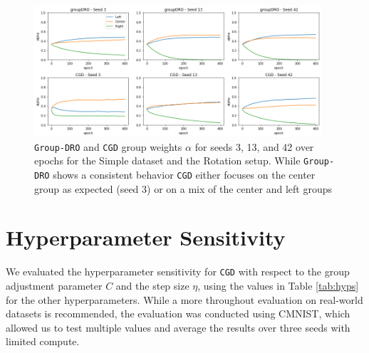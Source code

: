 
\begin{figure}[H]
   \includegraphics[width=0.95\textwidth]{media/rotation-3-13-42.png}
   \centering
   \caption{\texttt{Group-DRO} and \texttt{CGD} group weights $\alpha$ for seeds 3, 13, and 42 over epochs for the Simple dataset and the Rotation setup. While \texttt{Group-DRO} shows a consistent behavior \texttt{CGD} either focuses on the center group as expected (seed 3) or on a mix of the center and left groups}
   \label{fig:rot_per_seed}
\end{figure}

\vspace{-20pt}

\section{Hyperparameter Sensitivity}
\label{appendix:hyps-sensitivity}

We evaluated the hyperparameter sensitivity for \texttt{CGD} with respect to the group adjustment parameter $C$ and the step size $\eta$, using the values in Table \ref{tab:hyps} for the other hyperparameters. While a more throughout evaluation on real-world datasets is recommended, the evaluation was conducted using CMNIST, which allowed us to test multiple values and average the results over three seeds with limited compute.

